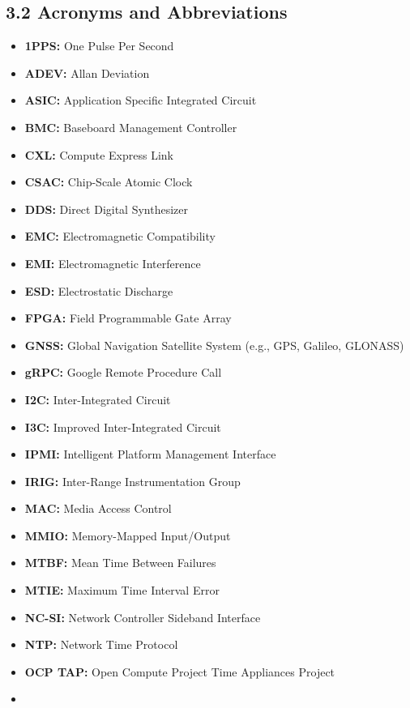 \subsection{3.2 Acronyms and
Abbreviations}\label{acronyms-and-abbreviations}

\begin{itemize}
\tightlist
\item
  \textbf{1PPS:} One Pulse Per Second
\item
  \textbf{ADEV:} Allan Deviation
\item
  \textbf{ASIC:} Application Specific Integrated Circuit
\item
  \textbf{BMC:} Baseboard Management Controller
\item
  \textbf{CXL:} Compute Express Link
\item
  \textbf{CSAC:} Chip-Scale Atomic Clock
\item
  \textbf{DDS:} Direct Digital Synthesizer
\item
  \textbf{EMC:} Electromagnetic Compatibility
\item
  \textbf{EMI:} Electromagnetic Interference
\item
  \textbf{ESD:} Electrostatic Discharge
\item
  \textbf{FPGA:} Field Programmable Gate Array
\item
  \textbf{GNSS:} Global Navigation Satellite System (e.g., GPS, Galileo,
  GLONASS)
\item
  \textbf{gRPC:} Google Remote Procedure Call
\item
  \textbf{I2C:} Inter-Integrated Circuit
\item
  \textbf{I3C:} Improved Inter-Integrated Circuit
\item
  \textbf{IPMI:} Intelligent Platform Management Interface
\item
  \textbf{IRIG:} Inter-Range Instrumentation Group
\item
  \textbf{MAC:} Media Access Control
\item
  \textbf{MMIO:} Memory-Mapped Input/Output
\item
  \textbf{MTBF:} Mean Time Between Failures
\item
  \textbf{MTIE:} Maximum Time Interval Error
\item
  \textbf{NC-SI:} Network Controller Sideband Interface
\item
  \textbf{NTP:} Network Time Protocol
\item
  \textbf{OCP TAP:} Open Compute Project Time Appliances Project
\item

\end{itemize}
